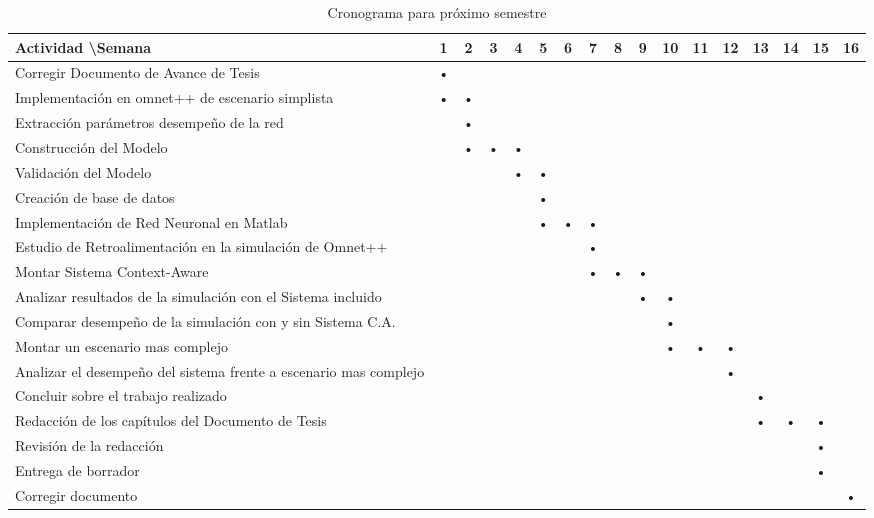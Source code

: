 \begin{table}[!htb]
\begin{tabular}{|p{}|c|c|c|c|c|c|c|c|c|c|c|c|c|c|c|c|}
\hline 
Actividad \textbackslash Semana & 1 & 2 & 3 & 4 & 5 & 6 & 7 & 8 & 9 & 10 & 11 & 12 & 13 & 14 & 15 & 16 \\ 
\hline 
Corregir Documento de Avance de Tesis & • &  &  &  &  &  &  &  &  &  &  &  & &  &  &  \\ 
\hline 
Implementación en omnet++ de escenario simplista  & • & • &  &  &  &  &  &  &  &  & &  &  &  &  &  \\ 
\hline 
Extracción parámetros desempeño de la red &  & • &  &  &  &  &  &  &  &  &  &  &  & &  &  \\ 
\hline 
Construcción del Modelo &  & • & • & • &  &  &  &  &  &  &  &  &  & &  &  \\ 
\hline 
Validación del Modelo &  &  &  & • & • &  &  &  &  &  &  &  &  & &  &  \\ 
\hline 
Creación de base de datos &  &  &  &  & • &  &  &  &  &  &  &  &  & &  &  \\ 
\hline 
Implementación de Red Neuronal en Matlab &  &  &  &  & • & • & • &  &  &  &  &  &  & &  &  \\  
\hline 
Estudio de Retroalimentación en la simulación de Omnet++ &  &  &  &  &  &  & • &  &  &  &  &  &  & &  &  \\ 
\hline 
Montar Sistema Context-Aware &  &  &  &  &  &  & • & • & • &  &  &  &  & &  &  \\ 
\hline 
Analizar resultados de la simulación con el Sistema incluido &  &  &  &  &  &  &  &  & • & • &  &  &  & &  &  \\ 
\hline 
Comparar desempeño de la simulación con y sin Sistema C.A. &  &  &  &  &  &  &  &  &  & • &  &  &  & &  &  \\ 
\hline 
Montar un escenario mas complejo  &  &  &  &  &  &  &  &  &  & • & • & • &  & &  &  \\ 
\hline 
Analizar el desempeño del sistema frente a escenario mas complejo &  &  &  &  &  &  &  &  &  &  &  & • &  & &  &  \\ 
\hline 
Concluir sobre el trabajo realizado &  &  &  &  &  &  &  &  &  &  &  &  & •  & &  &  \\ 
\hline 
Redacción de los capítulos del Documento de Tesis &  &  &  &  &  &  &  &  &  &  &  &  & •  & •& • &  \\
\hline 
Revisión de la redacción &  &  &  &  &  &  &  &  &  &  &  &  &  &  & • &  \\ 
\hline 
Entrega de borrador &  &  &  &  &  &  &  &  &  &  &  &  &  &  & • &  \\ 
\hline 
Corregir documento &  &  &  &  &  & &  &  &  &  &  &  &  &  &  & • \\ 
\hline 
\end{tabular}
\caption{Cronograma para próximo semestre}
\label{tab:tabcrono}

\end{table} 
